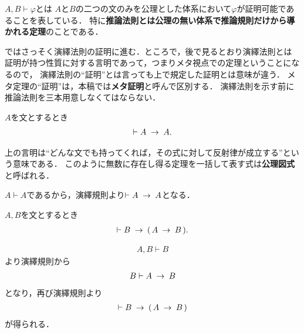 	$A,B \vdash \varphi$とは
	$A$と$B$の二つの文のみを公理とした体系において$\varphi$が証明可能であることを表している．
	特に{\bf 推論法則とは公理の無い体系で推論規則だけから導かれる定理}のことである．
	
	ではさっそく演繹法則の証明に進む．ところで，後で見るとおり演繹法則とは
	証明が持つ性質に対する言明であって，つまりメタ視点での定理ということになるので，
	演繹法則の``証明''とは言っても上で規定した証明とは意味が違う．
	メタ定理の``証明''は，本稿では{\bf メタ証明}と呼んで区別する．
	演繹法則を示す前に推論法則を三本用意しなくてはならない．
	
	\begin{screen}
		\begin{logicalthm}[含意の反射律]\label{logicalthm:reflective_law_of_implication}
			$A$を文とするとき
			\begin{align}
				\vdash A \hspace{0.25em}\rightarrow\hspace{0.25em} A.
			\end{align}
		\end{logicalthm}
	\end{screen}
	
	上の言明は``どんな文でも持ってくれば，その式に対して反射律が成立する''という意味である．
	このように無数に存在し得る定理を一括して表す式は{\bf 公理図式}と呼ばれる．
	
	\begin{prf}
		$A \vdash A$であるから，演繹規則より$\vdash A \hspace{0.25em}\rightarrow\hspace{0.25em} A$となる．
		\QED
	\end{prf}
	
	\begin{screen}
		\begin{logicalthm}[含意の導入]\label{logicalthm:rule_of_inference_2}
			$A,B$を文とするとき
			\begin{align}
				\vdash B \hspace{0.25em}\rightarrow\hspace{0.25em} (\, A \hspace{0.25em}\rightarrow\hspace{0.25em} B\, ).
			\end{align}
		\end{logicalthm}
	\end{screen}
	
	\begin{prf}
		\begin{align}
			A,B \vdash B
		\end{align}
		より演繹規則から
		\begin{align}
			B \vdash A \hspace{0.25em}\rightarrow\hspace{0.25em} B
		\end{align}
		となり，再び演繹規則より
		\begin{align}
			\vdash B \hspace{0.25em}\rightarrow\hspace{0.25em} (\, A \hspace{0.25em}\rightarrow\hspace{0.25em} B\, )
		\end{align}
		が得られる．
		\QED
	\end{prf}
	
